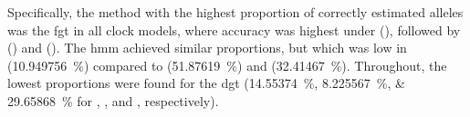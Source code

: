 Specifically, the method with the highest proportion of correctly estimated alleles was the \gls{fgt} in all  clock models, where accuracy was highest under \ClockR (), followed by \ClockC () and \ClockM ().
The \gls{hmm} achieved similar proportions, but which was low in \ClockR (\SI{10.949756}{\percent}) compared to \ClockC (\SI{51.87619}{\percent}) and \ClockM (\SI{32.41467}{\percent}).
Throughout, the lowest proportions were found for the \gls{dgt} (\SIlist{14.55374;8.225567;29.65868}{\percent} for \ClockM, \ClockR, and \ClockC, respectively).

%

%

